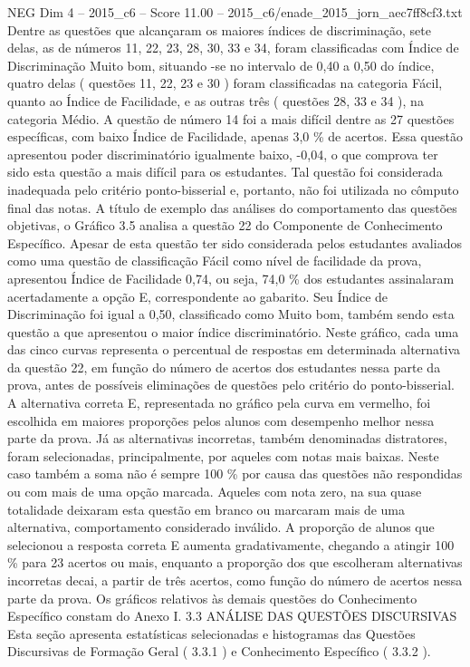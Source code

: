 \begin{textsample}{NEG Dim 4 – 2015\_c6 – Score 11.00 – 2015\_c6/enade\_2015\_jorn\_aec7ff8cf3.txt}
Dentre as questões que alcançaram os maiores índices de discriminação, sete delas, as de números 11, 22, 23, 28, 30, 33 e 34, foram classificadas com Índice de Discriminação Muito bom, situando -se no intervalo de 0,40 a 0,50 do índice, quatro delas ( questões 11, 22, 23 e 30 ) foram classificadas na categoria Fácil, quanto ao Índice de Facilidade, e as outras três ( questões 28, 33 e 34 ), na categoria Médio.
A questão de número 14 foi a mais difícil dentre as 27 questões específicas, com baixo Índice de Facilidade, apenas 3,0 \% de acertos.
Essa questão apresentou poder discriminatório igualmente baixo, -0,04, o que comprova ter sido esta questão a mais difícil para os estudantes.
Tal questão foi considerada inadequada pelo critério ponto-bisserial e, portanto, não foi utilizada no cômputo final das notas.
A título de exemplo das análises do comportamento das questões objetivas, o Gráfico 3.5 analisa a questão 22 do Componente de Conhecimento Específico.
Apesar de esta questão ter sido considerada pelos estudantes avaliados como uma questão de classificação Fácil como nível de facilidade da prova, apresentou Índice de Facilidade 0,74, ou seja, 74,0 \% dos estudantes assinalaram acertadamente a opção E, correspondente ao gabarito.
Seu Índice de Discriminação foi igual a 0,50, classificado como Muito bom, também sendo esta questão a que apresentou o maior índice discriminatório.
Neste gráfico, cada uma das cinco curvas representa o percentual de respostas em determinada alternativa da questão 22, em função do número de acertos dos estudantes nessa parte da prova, antes de possíveis eliminações de questões pelo critério do ponto-bisserial.
A alternativa correta E, representada no gráfico pela curva em vermelho, foi escolhida em maiores proporções pelos alunos com desempenho melhor nessa parte da prova.
Já as alternativas incorretas, também denominadas distratores, foram selecionadas, principalmente, por aqueles com notas mais baixas.
Neste caso também a soma não é sempre 100 \% por causa das questões não respondidas ou com mais de uma opção marcada.
Aqueles com nota zero, na sua quase totalidade deixaram esta questão em branco ou marcaram mais de uma alternativa, comportamento considerado inválido.
A proporção de alunos que selecionou a resposta correta E aumenta gradativamente, chegando a atingir 100 \% para 23 acertos ou mais, enquanto a proporção dos que escolheram alternativas incorretas decai, a partir de três acertos, como função do número de acertos nessa parte da prova.
Os gráficos relativos às demais questões do Conhecimento Específico constam do Anexo I. 3.3 ANÁLISE DAS QUESTÕES DISCURSIVAS Esta seção apresenta estatísticas selecionadas e histogramas das Questões Discursivas de Formação Geral ( 3.3.1 ) e Conhecimento Específico ( 3.3.2 ).

\end{textsample}
